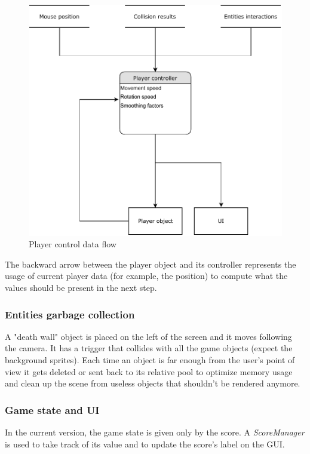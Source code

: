 \documentclass[11pt]{article}
\begin{document}
\begin{figure}[H]
  \centering
  \includegraphics[width=1.0\textwidth]{figures/player_controller}
  \caption{Player control data flow}
\end{figure}

The backward arrow between the player object and its controller represents the usage of current player data (for example, the position) to compute what the values should be present in the next step.

\subsubsection{Entities garbage collection}
A "death wall" object is placed on the left of the screen and it moves following the camera. It has a trigger that collides with all the game objects (expect the background sprites). Each time an object is far enough from the user's point of view it gets deleted or sent back to its relative pool to optimize memory usage and clean up the scene from useless objects that shouldn't be rendered anymore.

\subsubsection{Game state and UI}
In the current version, the game state is given only by the score. A \textit{ScoreManager} is used to take track of its value and to update the score's label on the GUI.
\end{document}
